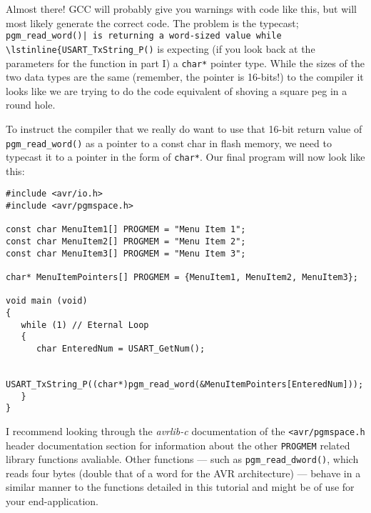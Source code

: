 Almost there! GCC will probably give you warnings with code like this, but will most likely generate the correct code. The problem is the typecast; \lstinline{pgm_read_word()| is returning a word-sized value while \lstinline{USART_TxString_P()} is expecting (if you look back at the parameters for the function in part I) a \lstinline{char*} pointer type. While the sizes of the two data types are the same (remember, the pointer is 16-bits!) to the compiler it looks like we are trying to do the code equivalent of shoving a square peg in a round hole.

To instruct the compiler that we really do want to use that 16-bit return value of \lstinline{pgm_read_word()} as a pointer to a const char in flash memory, we need to typecast it to a pointer in the form of \lstinline{char*}. Our final program will now look like this:

\begin{center}
\begin{lstlisting}
#include <avr/io.h>
#include <avr/pgmspace.h>

const char MenuItem1[] PROGMEM = "Menu Item 1";
const char MenuItem2[] PROGMEM = "Menu Item 2";
const char MenuItem3[] PROGMEM = "Menu Item 3";

char* MenuItemPointers[] PROGMEM = {MenuItem1, MenuItem2, MenuItem3};

void main (void)
{
   while (1) // Eternal Loop
   {
      char EnteredNum = USART_GetNum();

      USART_TxString_P((char*)pgm_read_word(&MenuItemPointers[EnteredNum]));
   }
}
\end{lstlisting}
\end{center}

I recommend looking through the \textit{avrlib-c} documentation of the \lstinline{<avr/pgmspace.h} header documentation section for information about the other \lstinline{PROGMEM} related library functions avaliable. Other functions --- such as \lstinline{pgm_read_dword()}, which reads four bytes (double that of a word for the AVR architecture) --- behave in a similar manner to the functions detailed in this tutorial and might be of use for your end-application.

